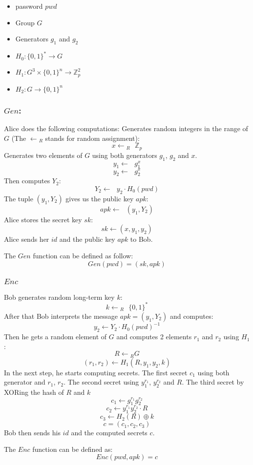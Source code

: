 \documentclass[../main.tex]{subfiles}
\begin{document}
\begin{itemize}
	\item password \(pwd\)
	\item Group \(G\)
	\item Generators \(g_1\) and \(g_2\)
	\item \(H_0: \{0,1\}^* \to G\)
	\item \(H_1: G^3 \times \{0,1\}^n \to \mathbb{Z}_p^2\)
	\item \(H_2: G \to \{0,1\}^n\)
\end{itemize}

\subsubsection{\(Gen\):} Alice does the following computations:
Generates random integers in the range of \(G\) (The \(\gets{_R}\) stands for
random assignment):
\[x \gets{_R} \text{ } \mathbb{Z}_p\] 
Generates two elements of \(G\) using both generators \(g_1\), \(g_2\) and \(x\).
\[y_1 \gets \text{ } g_1^x\] 
\[y_2 \gets \text{ } g_2^x\] 
Then computes \(Y_2\):
\[Y_2 \gets \text{ } y_2 \cdot H_0(pwd)\]
The tuple \((y_1, Y_2)\) gives us the public key \(apk\):
\[apk \gets \text{ } (y_1, Y_2)\]
Alice stores the secret key \(sk\):
\[sk \gets (x, y_1, y_2)\]
Alice sends her \(id\) and the public key \(apk\) to Bob.

The \(Gen\) function can be defined as follow:
\[Gen(pwd) = (sk, apk)\] 

\subsubsection{\(Enc\)} Bob generates random long-term key \(k\):
\[k \gets{_R} \text{ } \{0,1\}^*\] 
After that Bob interprets the message \(apk = (y_1, Y_2)\) and computes: 
\[y_2 \gets Y_2 \cdot H_0(pwd)^{-1}\]
Then he gets a random element of \(G\) and computes 2 elements \(r_1\) and
\(r_2\) using \(H_1\):
\[R \gets{_R} G\]
\[(r_1, r_2) \gets H_1(R, y_1, y_2, k)\]
In the next step, he starts computing secrets. The first secret \(c_1\) using both
generator and \(r_1\), \(r_2\). The second secret using \(y_1^{r_1}\),
\(y_2^{r_2}\) and \(R\). The third secret by XORing the hash of \(R\) and \(k\)
\[c_1 \gets g_1^{r_1} g_2^{r_2}\]
\[c_2 \gets y_1^{r_1} y_2^{r_2} \cdot R\]
\[c_3 \gets H_2(R) \oplus k\]
\[c = (c_1, c_2, c_3)\]
Bob then sends his \(id\) and the computed secrets \(c\).

The \(Enc\) function can be defined as:
\[Enc(pwd, apk) = c\]
\end{document}

